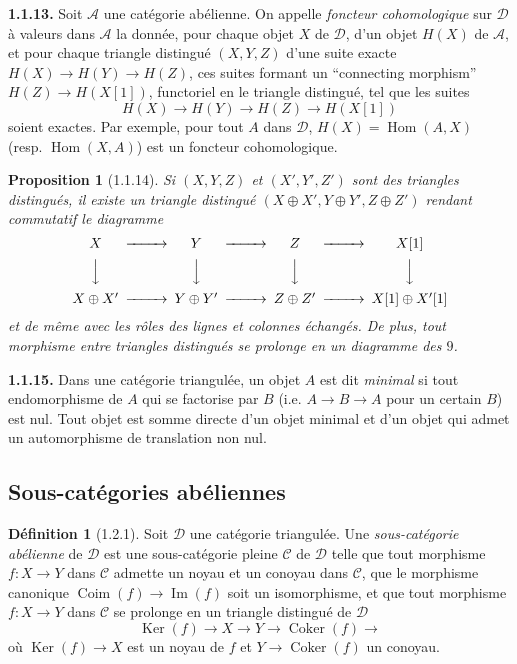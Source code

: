 \documentclass[12pt,a4paper]{article}
\theoremstyle{plain}
\newtheorem{proposition}[theorem]{Proposition}
\theoremstyle{definition}
\newtheorem{definition}[theorem]{Définition}
\theoremstyle{remark}
\DeclareMathOperator{\Hom}{Hom}
\DeclareMathOperator{\Ker}{Ker}
\DeclareMathOperator{\Coker}{Coker}
\DeclareMathOperator{\Coim}{Coim}
\DeclareMathOperator{\pIm}{Im}
\newcommand{\cA}{\mathcal{A}}
\newcommand{\cC}{\mathcal{C}}
\newcommand{\cD}{\mathcal{D}}
\begin{document}
\smallskip

\noindent
\textbf{1.1.13.} Soit $\cA$ une catégorie abélienne. On appelle \emph{foncteur cohomologique} sur $\cD$ à valeurs dans $\cA$ la donnée, pour chaque objet $X$ de $\cD$, d'un objet $H(X)$ de $\cA$, et pour chaque triangle distingué $(X, Y, Z)$ d'une suite exacte $H(X) \to H(Y) \to H(Z)$, ces suites formant un ``connecting morphism'' $H(Z) \to H(X[1])$, functoriel en le triangle distingué, tel que les suites
\[
H(X) \to H(Y) \to H(Z) \to H(X[1])
\]
soient exactes. Par exemple, pour tout $A$ dans $\cD$, $H(X) = \Hom(A, X)$ (resp. $\Hom(X, A)$) est un foncteur cohomologique.

\begin{proposition}[1.1.14]
Si $(X, Y, Z)$ et $(X', Y', Z')$ sont des triangles distingués, il existe un triangle distingué $(X \oplus X', Y \oplus Y', Z \oplus Z')$ rendant commutatif le diagramme
\[
\begin{CD}
X @>>> Y @>>> Z @>>> X[1] \\
@VVV @VVV @VVV @VVV \\
X \oplus X' @>>> Y \oplus Y' @>>> Z \oplus Z' @>>> X[1] \oplus X'[1]
\end{CD}
\]
et de même avec les rôles des lignes et colonnes échangés. De plus, tout morphisme entre triangles distingués se prolonge en un diagramme des $9$.
\end{proposition}

\smallskip

\noindent
\textbf{1.1.15.} Dans une catégorie triangulée, un objet $A$ est dit \emph{minimal} si tout endomorphisme de $A$ qui se factorise par $B$ (i.e. $A \to B \to A$ pour un certain $B$) est nul. Tout objet est somme directe d'un objet minimal et d'un objet qui admet un automorphisme de translation non nul.

\smallskip

\subsection{Sous-catégories abéliennes}

\begin{definition}[1.2.1]
Soit $\cD$ une catégorie triangulée. Une \emph{sous-catégorie abélienne} de $\cD$ est une sous-catégorie pleine $\cC$ de $\cD$ telle que tout morphisme $f : X \to Y$ dans $\cC$ admette un noyau et un conoyau dans $\cC$, que le morphisme canonique $\Coim(f) \to \pIm(f)$ soit un isomorphisme, et que tout morphisme $f : X \to Y$ dans $\cC$ se prolonge en un triangle distingué de $\cD$
\[
\Ker(f) \to X \to Y \to \Coker(f) \to
\]
où $\Ker(f) \to X$ est un noyau de $f$ et $Y \to \Coker(f)$ un conoyau.
\end{definition}
\end{document}
